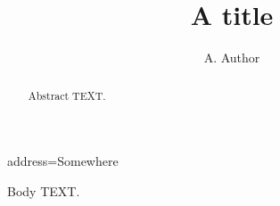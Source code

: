 \documentclass[final]{aipproc}
\begin{document}
\title{A title}
\author{A. Author}{address={Somewhere}}
\begin{abstract}
Abstract TEXT.
\end{abstract}
\maketitle
{}
Body TEXT.
\end{document}
